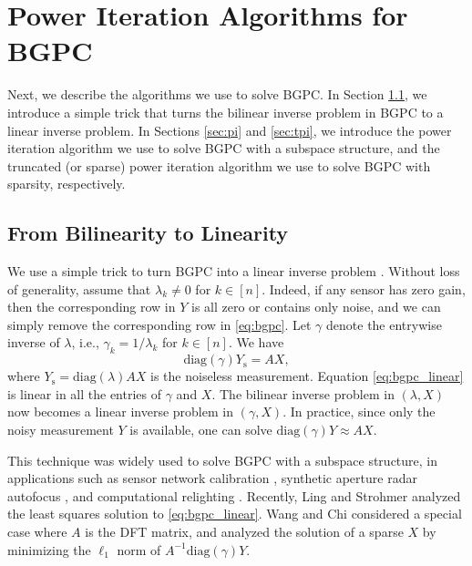 \documentclass[11pt,journal]{IEEEtran}
\newcommand{\rms}{\mathrm{s}}
\newcommand{\diag}{\mathrm{diag}}
\begin{document}

\section{Power Iteration Algorithms for BGPC} \label{sec:algorithm}

Next, we describe the algorithms we use to solve BGPC. In Section \ref{sec:linear}, we introduce a simple trick that turns the bilinear inverse problem in BGPC to a linear inverse problem. In Sections \ref{sec:pi} and \ref{sec:tpi}, we introduce the power iteration algorithm we use to solve BGPC with a subspace structure, and the truncated (or sparse) power iteration algorithm we use to solve BGPC with sparsity, respectively.  

\subsection{From Bilinearity to Linearity}\label{sec:linear}
We use a simple trick to turn BGPC into a linear inverse problem \cite{Balzano2007}. Without loss of generality, assume that $\lambda_k\neq 0$ for $k\in[n]$. Indeed, if any sensor has zero gain, then the corresponding row in $Y$ is all zero or contains only noise, and we can simply remove the corresponding row in \eqref{eq:bgpc}. Let $\gamma$ denote the entrywise inverse of $\lambda$, i.e., $\gamma_k = 1/\lambda_k$ for $k\in[n]$. We have
\begin{equation}
\label{eq:bgpc_linear}
\diag(\gamma) Y_\rms = AX,
\end{equation}
where $Y_\rms = \diag(\lambda) AX$ is the noiseless measurement. Equation \eqref{eq:bgpc_linear} is linear in all the entries of $\gamma$ and $X$. The bilinear inverse problem in $(\lambda, X)$ now becomes a linear inverse problem in $(\gamma, X)$. In practice, since only the noisy measurement $Y$ is available, one can solve $\diag(\gamma) Y \approx AX$.

This technique was widely used to solve BGPC with a subspace structure, in applications such as sensor network calibration \cite{Balzano2007}, synthetic aperture radar autofocus \cite{Morrison2009}, and computational relighting \cite{Nguyen2013}. Recently, Ling and Strohmer \cite{Ling2016} analyzed the least squares solution to \eqref{eq:bgpc_linear}. Wang and Chi \cite{Wang2016} considered a special case where $A$ is the DFT matrix, and analyzed the solution of a sparse $X$ by minimizing the $\ell_1$ norm of $A^{-1}\diag(\gamma)Y$. 
\end{document}
